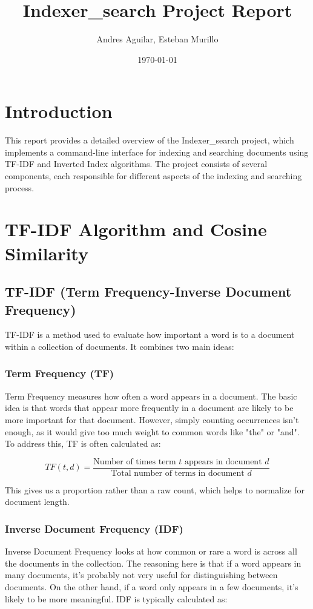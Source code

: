 \documentclass{article}
\title{Indexer\_search Project Report}
\author{Andres Aguilar, Esteban Murillo}
\date{\today}
\begin{document}
\maketitle

\section{Introduction}
This report provides a detailed overview of the Indexer\_search project, which implements a command-line interface for indexing and searching documents using TF-IDF and Inverted Index algorithms. The project consists of several components, each responsible for different aspects of the indexing and searching process.

\section{TF-IDF Algorithm and Cosine Similarity}

\subsection{TF-IDF (Term Frequency-Inverse Document Frequency)}
TF-IDF is a method used to evaluate how important a word is to a document within a collection of documents. It combines two main ideas:

\subsubsection{Term Frequency (TF)}
Term Frequency measures how often a word appears in a document. The basic idea is that words that appear more frequently in a document are likely to be more important for that document. However, simply counting occurrences isn't enough, as it would give too much weight to common words like "the" or "and". To address this, TF is often calculated as:

\begin{equation}
TF(t,d) = \frac{\text{Number of times term } t \text{ appears in document } d}{\text{Total number of terms in document } d}
\end{equation}

This gives us a proportion rather than a raw count, which helps to normalize for document length.

\subsubsection{Inverse Document Frequency (IDF)}
Inverse Document Frequency looks at how common or rare a word is across all the documents in the collection. The reasoning here is that if a word appears in many documents, it's probably not very useful for distinguishing between documents. On the other hand, if a word only appears in a few documents, it's likely to be more meaningful. IDF is typically calculated as:
\end{document}
